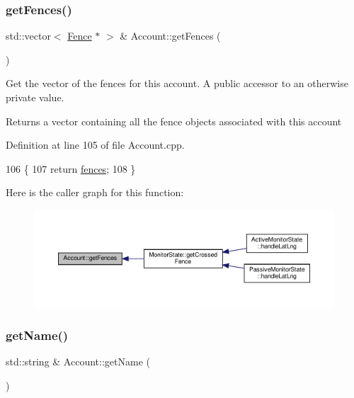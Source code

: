 \subsubsection{\texorpdfstring{get\+Fences()}{getFences()}}
{\footnotesize\ttfamily std\+::vector$<$ \hyperlink{class_fence}{Fence} $\ast$ $>$ \& Account\+::get\+Fences (\begin{DoxyParamCaption}{ }\end{DoxyParamCaption})}

Get the vector of the fences for this account. A public accessor to an otherwise private value.

\begin{DoxyReturn}{Returns}
a vector containing all the fence objects associated with this account 
\end{DoxyReturn}


Definition at line 105 of file Account.\+cpp.


\begin{DoxyCode}
106 \{
107     \textcolor{keywordflow}{return} \hyperlink{class_account_ad92a9e8008371f34da06cd416a716fa1}{fences};
108 \}
\end{DoxyCode}
Here is the caller graph for this function\+:
\nopagebreak
\begin{figure}[H]
\begin{center}
\leavevmode
\includegraphics[width=350pt]{db/d22/class_account_a5117acc0c4ef7be21c5339bd9ae84e40_icgraph}
\end{center}
\end{figure}
\mbox{\label{class_account_a1ef22885e8c6f145475c3306a4e6d74a}} 
\subsubsection{\texorpdfstring{get\+Name()}{getName()}}
{\footnotesize\ttfamily std\+::string \& Account\+::get\+Name (\begin{DoxyParamCaption}{ }\end{DoxyParamCaption})}

